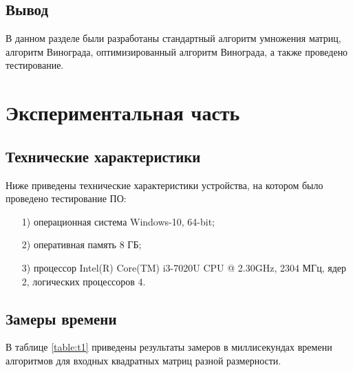 \documentclass[a4paper,14pt, unknownkeysallowed]{extreport}
\begin{document}
\section*{Вывод}
В данном разделе были разработаны стандартный алгоритм умножения матриц, алгоритм Винограда, оптимизированный алгоритм Винограда, а также проведено тестирование.
	
\chapter{Экспериментальная часть}
	
\section{Технические характеристики}
Ниже приведены технические характеристики устройства, на котором было проведено тестирование ПО:
	
\begin{enumerate}
	\item[1)] операционная система Windows-10, 64-bit;
	\item[2)] оперативная память 8 ГБ;
	\item[3)] процессор	Intel(R) Core(TM) i3-7020U CPU @ 2.30GHz, 2304 МГц, ядер 2, логических процессоров 4.
\end{enumerate}
	
\section{Замеры времени}
	
В таблице \ref{table:t1} приведены результаты замеров в миллисекундах времени алгоритмов для входных квадратных матриц разной размерности.
 
\end{document}
